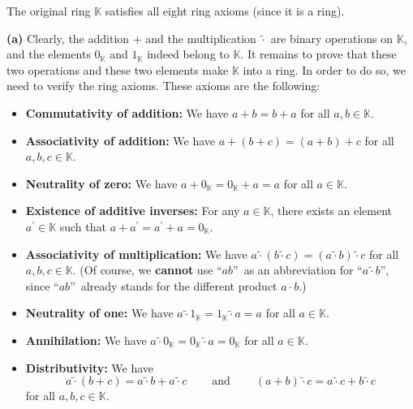 \documentclass[paper=a4, fontsize=12pt]{scrartcl}%
\theoremstyle{plainsl}
\theoremstyle{definition}
\theoremstyle{remark}
\begin{document}
The original ring $\mathbb{K}$ satisfies all eight ring axioms (since it is a ring).

\bigskip

\textbf{(a)} Clearly, the addition $+$ and the multiplication $\left.
\widetilde{\cdot}\right.  $ are binary operations on $\mathbb{K}$, and the
elements $0_{\mathbb{K}}$ and $1_{\mathbb{K}}$ indeed belong to $\mathbb{K}$.
It remains to prove that these two operations and these two elements make
$\mathbb{K}$ into a ring. In order to do so, we need to verify the ring
axioms. These axioms are the following:

\begin{itemize}
\item \textbf{Commutativity of addition:} We have $a+b=b+a$ for all
$a,b\in\mathbb{K}$.

\item \textbf{Associativity of addition:} We have $a+\left(  b+c\right)
=\left(  a+b\right)  +c$ for all $a,b,c\in\mathbb{K}$.

\item \textbf{Neutrality of zero:} We have $a+0_{\mathbb{K}}=0_{\mathbb{K}%
}+a=a$ for all $a\in\mathbb{K}$.

\item \textbf{Existence of additive inverses:} For any $a\in\mathbb{K}$, there
exists an element $a^{\prime}\in\mathbb{K}$ such that $a+a^{\prime}=a^{\prime
}+a=0_{\mathbb{K}}$.

\item \textbf{Associativity of multiplication:} We have $a\left.
\widetilde{\cdot}\right.  \left(  b\left.  \widetilde{\cdot}\right.  c\right)
=\left(  a\left.  \widetilde{\cdot}\right.  b\right)  \left.  \widetilde{\cdot
}\right.  c$ for all $a,b,c\in\mathbb{K}$. (Of course, we \textbf{cannot} use
\textquotedblleft$ab$\textquotedblright\ as an abbreviation for
\textquotedblleft$a\left.  \widetilde{\cdot}\right.  b$\textquotedblright,
since \textquotedblleft$ab$\textquotedblright\ already stands for the
different product $a\cdot b$.)

\item \textbf{Neutrality of one:} We have $a\left.  \widetilde{\cdot}\right.
1_{\mathbb{K}}=1_{\mathbb{K}}\left.  \widetilde{\cdot}\right.  a=a$ for all
$a\in\mathbb{K}$.

\item \textbf{Annihilation:} We have $a\left.  \widetilde{\cdot}\right.
0_{\mathbb{K}}=0_{\mathbb{K}}\left.  \widetilde{\cdot}\right.  a=0_{\mathbb{K}%
}$ for all $a\in\mathbb{K}$.

\item \textbf{Distributivity:} We have%
\[
a\left.  \widetilde{\cdot}\right.  \left(  b+c\right)  =a\left.
\widetilde{\cdot}\right.  b+a\left.  \widetilde{\cdot}\right.
c\ \ \ \ \ \ \ \ \ \ \text{and}\ \ \ \ \ \ \ \ \ \ \left(  a+b\right)  \left.
\widetilde{\cdot}\right.  c=a\left.  \widetilde{\cdot}\right.  c+b\left.
\widetilde{\cdot}\right.  c
\]
for all $a,b,c\in\mathbb{K}$.
\end{itemize}
\end{document}
